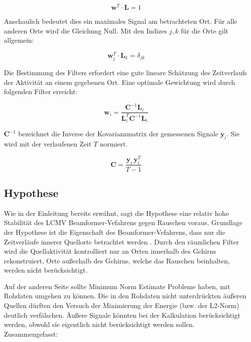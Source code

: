 \documentclass[doc,a4paper,12pt]{apa6}
\newcommand{\mx}[1]{\mathbf{#1}}
\begin{document}
\begin{equation}
\mx{w}^T \cdot \mx{L} = 1
\end{equation}

Anschaulich bedeutet dies ein maximales Signal am betrachteten Ort. Für alle anderen Orte wird die Gleichung Null. Mit den Indizes $j,k$ für die Orte gilt allgemein:

\begin{equation}
\mx{w}^T_{j} \cdot \mx{L}_{k} = \delta_{jk}
\end{equation}

Die Bestimmung des Filters erfordert eine gute lineare Schätzung des Zeitverlaufs der Aktivität an einem gegebenen Ort. Eine optimale Gewichtung \parencite[z.B.][]{haykin2008adaptive} wird durch folgenden Filter erreicht:

\begin{equation}
\label{eq:beam-filter-w}
\mx{w}_i = \frac{\mx{C}^{-1} \mx{L}_i}{\mx{L}^T_i \mx{C}^{-1} \mx{L}_i}
\end{equation}

$\mx{C}^{-1}$ bezeichnet die Inverse der Kovarianzmatrix der gemessenen Signale $\mx{y}_i$. Sie wird mit der verlaufenen Zeit $T$ normiert.

\begin{equation}
\mx{C} = \frac{\mx{y}_i\,\mx{y}_i^T}{T-1}
\end{equation}

\subsection{Hypothese}
\label{sec:hypo}

Wie in der Einleitung bereits erwähnt, sagt die Hypothese eine relativ hohe Stabilität des LCMV Beamformer-Vefahrens gegen Rauschen voraus. Grundlage der Hypothese ist die Eigenschaft des Beamformer-Vefahrens, dass nur die Zeitverläufe innerer Quellorte betrachtet werden \parencite{van1997localization}. Durch den räumlichen Filter wird die Quellaktivität kontrolliert nur an Orten innerhalb des Gehirns rekonstruiert, Orte außerhalb des Gehirns, welche das Rauschen beinhalten, werden nicht berücksichtigt.

Auf der anderen Seite sollte Minimum Norm Estimate Probleme haben, mit Rohdaten umgehen zu können. Die in den Rohdaten nicht unterdrückten äußeren Quellen dürften den Versuch der Minimierung der Energie (bzw. der L2-Norm) deutlich verfälschen. Äußere Signale könnten bei der Kalkulation berücksichtigt werden, obwohl sie eigentlich nicht berücksichtigt werden sollen. Zusammengefasst:
\end{document}
